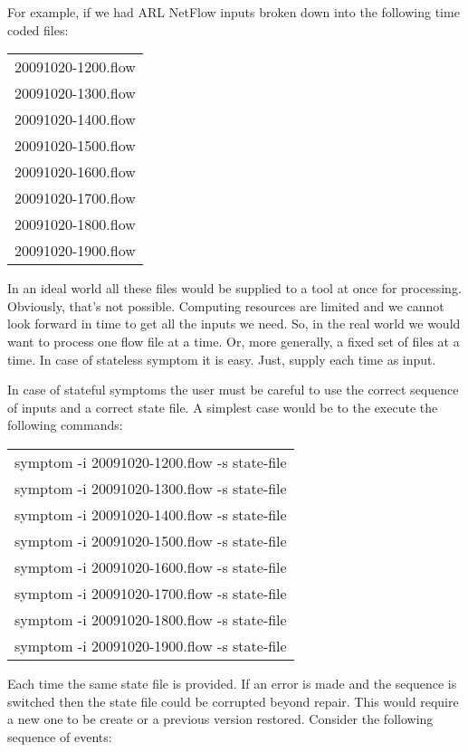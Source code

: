 \documentclass[titlepage,12pt]{report}
\begin{document}
For example, if we had ARL NetFlow inputs broken down into the following time coded files:

\begin{center}
\begin{tabular}{l}
20091020-1200.flow \\
20091020-1300.flow \\
20091020-1400.flow \\
20091020-1500.flow \\
20091020-1600.flow \\
20091020-1700.flow \\
20091020-1800.flow \\
20091020-1900.flow \\
\end{tabular}
\end{center}

In an ideal world all these files would be supplied to a tool at once for processing. Obviously, that's not possible. Computing resources are limited and we cannot look forward in time to get all the inputs we need. So, in the real world we would want to process one flow file at a time. Or, more generally, a fixed set of files at a time. In case of stateless symptom it is easy. Just, supply each time as input.

In case of stateful symptoms the user must be careful to use the correct sequence of inputs and a correct state file. A simplest case would be to the execute the following commands:

\begin{center}
\begin{tabular}{l}
symptom -i 20091020-1200.flow -s state-file \\
symptom -i 20091020-1300.flow -s state-file  \\
symptom -i 20091020-1400.flow -s state-file  \\
symptom -i 20091020-1500.flow -s state-file  \\
symptom -i 20091020-1600.flow -s state-file  \\
symptom -i 20091020-1700.flow -s state-file  \\
symptom -i 20091020-1800.flow -s state-file  \\
symptom -i 20091020-1900.flow -s state-file  \\
\end{tabular}
\end{center}

Each time the same state file is provided. If an error is made and the sequence is switched then the state file could be corrupted beyond repair. This would require a new one to be create or a previous version restored. Consider the following sequence of events:
\end{document}
